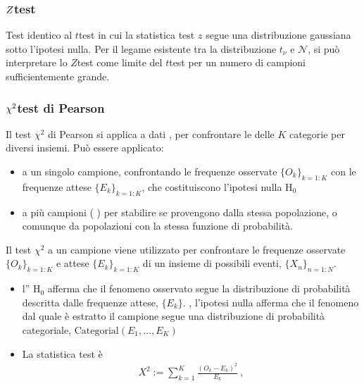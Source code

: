 \documentclass[letterpaper,10pt,italian]{jupyterBook}
\begin{document}
\subsubsection{\protect\(Z\protect\)\sphinxhyphen{}test}
\label{\detokenize{ch/statistics/hp-test-single:z-test}}\label{\detokenize{ch/statistics/hp-test-single:hp-test-single-z}}
\sphinxAtStartPar
Test identico al \(t\)\sphinxhyphen{}test in cui la statistica test \(z\) segue una distribuzione gaussiana sotto l’ipotesi nulla. Per il legame esistente tra la distribuzione \(t_{\nu}\) e \(\mathscr{N}\), si può interpretare lo \(Z\)\sphinxhyphen{}test come limite del \(t\)\sphinxhyphen{}test per un numero di campioni sufficientemente grande.


\subsubsection{\protect\(\chi^2\protect\)\sphinxhyphen{}test di Pearson}
\label{\detokenize{ch/statistics/hp-test-single:chi-2-test-di-pearson}}\label{\detokenize{ch/statistics/hp-test-single:hp-test-single-chi2-pearson}}
\sphinxAtStartPar
Il test \(\chi^2\) di Pearson si applica a dati , per confrontare le  delle \(K\) categorie per diversi insiemi. Può essere applicato:
\begin{itemize}
\item {} 
\sphinxAtStartPar
a un singolo campione, confrontando le frequenze osservate \(\{ O_k \}_{k=1:K}\) con le frequenze attese \(\{ E_k \}_{k=1:K}\), che costituiscono l’ipotesi nulla \(\text{H}_0\)

\item {} 
\sphinxAtStartPar
a più campioni ( ) per stabilire se provengono dalla stessa popolazione, o comunque da popolazioni con la stessa funzione di probabilità.

\end{itemize}

\sphinxAtStartPar
Il test \(\chi^2\) a un campione viene utilizzato per confrontare le frequenze osservate \(\{ O_k \}_{k=1:K}\)  e attese  \(\{ E_k \}_{k=1:K}\)  di un insieme di possibili eventi, \(\{ X_n \}_{n=1:N}\).
\begin{itemize}
\item {} 
\sphinxAtStartPar
l” \(\text{H}_0\) afferma che il fenomeno osservato segue la distribuzione di probabilità descritta dalle frequenze attese, \(\{ E_k \}\). , l’ipotesi nulla afferma che il fenomeno dal quale è estratto il campione segue una distribuzione di probabilità categoriale, \(\text{Categorial}(E_1,\dots,E_K)\)

\item {} 
\sphinxAtStartPar
La statistica test è
\begin{equation*}
\begin{split}X^2 := \sum_{k=1}^{K} \frac{(O_k - E_k)^2}{E_k} \ ,\end{split}
\end{equation*}
\end{itemize}
\end{document}
